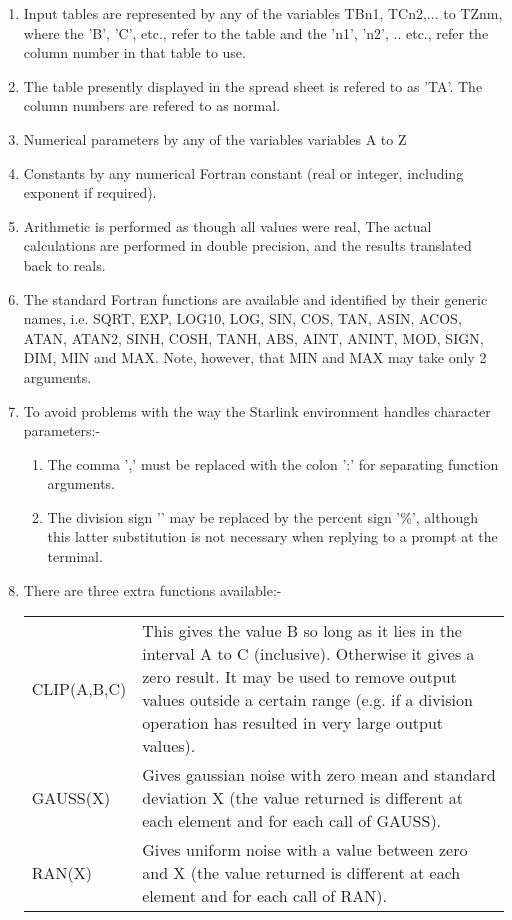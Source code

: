 \begin{small}
{{\begin{enumerate}
 \item Input tables are represented by any of the variables TBn1, TCn2,...
       to TZnm, where the 'B', 'C', etc., refer to the table and the 'n1',
       'n2', .. etc., refer the column number in that table to use.

 \item The table presently displayed in the spread sheet is refered to
       as 'TA'. The column numbers are refered to as normal.

 \item Numerical parameters by any of the variables variables A to Z
 \item Constants by any numerical Fortran constant (real or integer,
    including exponent if required).
 \item Arithmetic is performed as though all values were real, The actual
    calculations are performed in double precision, and the results
    translated back to reals.
 \item The standard Fortran functions are available and identified
    by their generic names, i.e. SQRT, EXP, LOG10, LOG, SIN, COS, TAN,
    ASIN, ACOS, ATAN, ATAN2, SINH, COSH, TANH, ABS, AINT, ANINT, MOD,
    SIGN, DIM, MIN and MAX. Note, however, that MIN and MAX may take only
    2 arguments.
 \item To avoid problems with the way the Starlink environment
    handles character parameters:-
    \begin{enumerate}
       \item The comma ',' must be replaced with
             the colon ':' for separating function arguments.
       \item The division sign '\/' may be replaced by the percent sign '\%',
             although this latter substitution is not necessary when
             replying to a prompt at the terminal.
    \end{enumerate}
 \item There are three extra functions available:-

    \begin{tabular}{lp{4in}}
    CLIP(A,B,C) & This gives the value B so long as it lies in the
                 interval A to C (inclusive). Otherwise it gives a
                 zero result. It may be used to remove output values
                 outside a certain range (e.g. if a division operation
                 has resulted in very large output values). \\
    GAUSS(X)    & Gives gaussian noise with zero mean and standard
                 deviation X (the value returned is different at each
                 element and for each call of GAUSS). \\
    RAN(X)      & Gives uniform noise with a value between zero and X
                 (the value returned is different at each element and
                 for each call of RAN). \\
    \end{tabular}
  \end{enumerate}

}}
\end{small}
